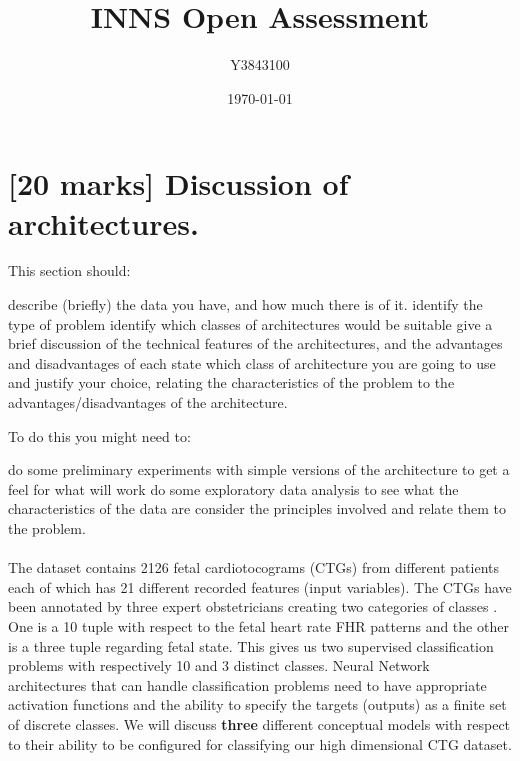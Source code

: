 \documentclass[11pt,a4paper]{article}
\title{INNS Open Assessment}
\author{Y3843100}
\date{\today}
\begin{document}


\maketitle


\section{[20 marks] Discussion of architectures.}

This section should:
\begin{outline}
  \1 describe (briefly) the data you have, and how much there is of it.
  \1 identify the type of problem
  \1 identify which classes of architectures would be suitable
  \1 give a brief discussion of the technical features of the architectures, and the advantages and disadvantages of each
  \1 state which class of architecture you are going to use and justify your choice, relating the characteristics of the problem to the advantages/disadvantages of the architecture.
\end{outline}

To do this you might need to:
\begin{outline}
  \1 do some preliminary experiments with simple versions of the architecture to get a feel for what will work
  \1 do some exploratory data analysis to see what the characteristics of the data are
  \1 consider the principles involved and relate them to the problem.
\end{outline}

\paragraph{}
The dataset contains 2126 fetal cardiotocograms (CTGs) from different patients each of which has 21 different recorded features (input variables). The CTGs have been annotated by three expert obstetricians creating two categories of classes \autocite{Campos:2000}. One is a 10 tuple with respect to the fetal heart rate FHR patterns and the other is a three tuple regarding fetal state. This gives us two supervised classification problems with respectively 10 and 3 distinct classes. Neural Network architectures that can handle classification problems need to have appropriate activation functions and the ability to specify the targets (outputs) as a finite set of discrete classes. We will discuss \textbf{three} different conceptual models with respect to their ability to be configured for classifying our high dimensional CTG dataset.
\end{document}
